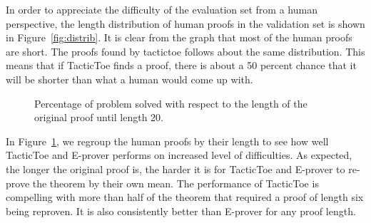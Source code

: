 \documentclass[runningheads,a4paper,draft]{svjour3}
\def\eprover{\textsf{E-prover}\xspace}
\def\tactictoe{\textsf{TacticToe}\xspace}
\begin{document}
In order to appreciate the difficulty of the evaluation set from a human
perspective, the length distribution of human proofs in the
validation set is shown in Figure~\ref{fig:distrib}.  It is clear from the
graph that most of the human proofs are short. The proofs found by tactictoe 
follows about the same
distribution. This means that if \tactictoe finds a proof, there is about a 50
percent chance that it will be shorter than what a human would come up with.


\begin{figure}[h]
\centering
{}
\caption{\label{fig:percentage}Percentage of problem solved with respect to the
length of the
original proof until length 20.}
\end{figure}

In Figure~\ref{fig:percentage}, we regroup the human proofs by their length to
see how well \tactictoe and \eprover performs on increased level of
difficulties. As expected, the longer the original proof is, the harder it is
for \tactictoe and \eprover to re-prove the theorem by their own mean.
The performance of \tactictoe is compelling with more than half of the theorem
that required a proof of length six being reproven. It is also consistently
better than \eprover for any proof length.
\end{document}
